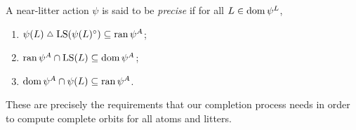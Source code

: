 \begin{definition}
    \label{def:precise}
    A near-litter action \( \psi \) is said to be \emph{precise} if for all \( L \in \operatorname{dom} \psi^L \),
    \begin{enumerate}
        \item \( \psi(L) \symmdiff \LS(\psi(L)^\circ) \subseteq \ran \psi^A \);
        \item \( \operatorname{ran} \psi^A \cap \operatorname{LS}(L) \subseteq \operatorname{dom} \psi^A \);
        \item \( \operatorname{dom} \psi^A \cap \psi(L) \subseteq \operatorname{ran} \psi^A \).
    \end{enumerate}
\end{definition}

These are precisely the requirements that our completion process needs in order to compute complete orbits for all atoms and litters.

